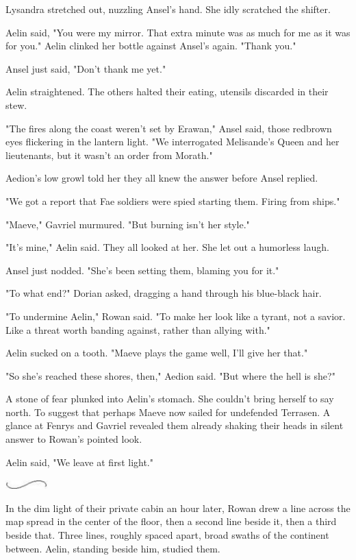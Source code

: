 Lysandra stretched out, nuzzling Ansel's hand. She idly scratched the shifter.

Aelin said, "You were my mirror. That extra minute was as much for me as it was for you." Aelin clinked her bottle against Ansel's again. "Thank you."

Ansel just said, "Don't thank me yet."

Aelin straightened. The others halted their eating, utensils discarded in their stew.

"The fires along the coast weren't set by Erawan," Ansel said, those redbrown eyes flickering in the lantern light. "We interrogated Melisande's Queen and her lieutenants, but  it wasn't an order from Morath."

Aedion's low growl told her they all knew the answer before Ansel replied.

"We got a report that Fae soldiers were spied starting them. Firing from ships."

"Maeve," Gavriel murmured. "But burning isn't her style."

"It's mine," Aelin said. They all looked at her. She let out a humorless laugh.

Ansel just nodded. "She's been setting them, blaming you for it."

"To what end?" Dorian asked, dragging a hand through his blue-black hair.

"To undermine Aelin," Rowan said. "To make her look like a tyrant, not a savior. Like a threat worth banding against, rather than allying with."

Aelin sucked on a tooth. "Maeve plays the game well, I'll give her that."

"So she's reached these shores, then," Aedion said. "But where the hell is she?"

A stone of fear plunked into Aelin's stomach. She couldn't bring herself to say north. To suggest that perhaps Maeve now sailed for undefended Terrasen. A glance at Fenrys and Gavriel revealed them already shaking their heads in silent answer to Rowan's pointed look.

Aelin said, "We leave at first light."

\includegraphics[width=0.65in,height=0.13in]{images/seperator}

In the dim light of their private cabin an hour later, Rowan drew a line across the map spread in the center of the floor, then a second line beside it, then a third beside that. Three lines, roughly spaced apart, broad swaths of the continent between. Aelin, standing beside him, studied them.

